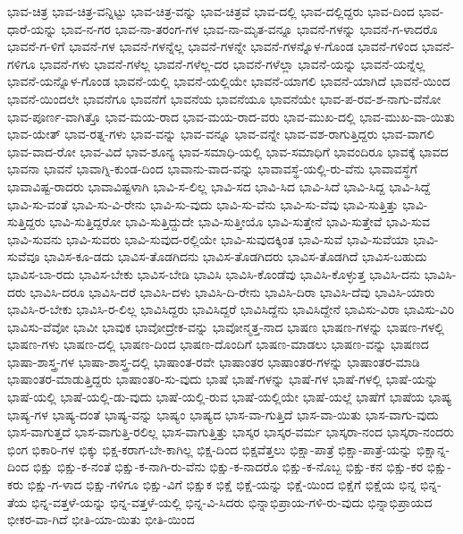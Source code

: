 {ಭಾವ-ಚಿತ್ರ
ಭಾವ-ಚಿತ್ರ-ವನ್ನಿಟ್ಟು
ಭಾವ-ಚಿತ್ರ-ವನ್ನು
ಭಾವ-ಚಿತ್ರವೆ
ಭಾವ-ದಲ್ಲಿ
ಭಾವ-ದಲ್ಲಿದ್ದರು
ಭಾವ-ದಿಂದ
ಭಾವ-ಧಾರೆ-ಯನ್ನು
ಭಾವ-ನ-ಗರ
ಭಾವ-ನಾ-ತರಂಗ-ಗಳ
ಭಾವ-ನಾ-ಮೃತ-ವನ್ನೂ
ಭಾವನೆ-ಗಳನ್ನು
ಭಾವನೆ-ಗ-ಳಾದರೊ
ಭಾವನೆ-ಗ-ಳಿಗೆ
ಭಾವನೆ-ಗಳ
ಭಾವನೆ-ಗಳನ್ನೆಲ್ಲ
ಭಾವನೆ-ಗಳನ್ನೇ
ಭಾವನೆ-ಗಳನ್ನೊಳ-ಗೊಂಡ
ಭಾವನೆ-ಗಳಿಂದ
ಭಾವನೆ-ಗಳಿಗೂ
ಭಾವನೆ-ಗಳು
ಭಾವನೆ-ಗಳೆಲ್ಲ
ಭಾವನೆ-ಗಳೆಲ್ಲ-ದರ
ಭಾವನೆ-ಗಳೆಲ್ಲಾ
ಭಾವನೆ-ಯನ್ನು
ಭಾವನೆ-ಯನ್ನೆಲ್ಲ
ಭಾವನೆ-ಯನ್ನೊಳ-ಗೊಂಡ
ಭಾವನೆ-ಯಲ್ಲಿ
ಭಾವನೆ-ಯಲ್ಲಿಯೇ
ಭಾವನೆ-ಯಾಗಲಿ
ಭಾವನೆ-ಯಾಗಿದೆ
ಭಾವನೆ-ಯಿಂದ
ಭಾವನೆ-ಯಿಂದಲೇ
ಭಾವನೆಗೂ
ಭಾವನೆಗೆ
ಭಾವನೆಯ
ಭಾವನೆಯೂ
ಭಾವನೆಯೇ
ಭಾವ-ಪ-ರವ-ಶ-ನಾಗು-ವೆನೋ
ಭಾವ-ಪೂರ್ಣ-ವಾಗಿತ್ತೊ
ಭಾವ-ಮಯ-ರಾದ
ಭಾವ-ಮಯ-ರಾದ-ವರು
ಭಾವ-ಮುಖ-ದಲ್ಲಿ
ಭಾವ-ಮುಖ-ವಾ-ಯಿತು
ಭಾವ-ಯೇತ್
ಭಾವ-ರತ್ನ-ಗಳು
ಭಾವ-ವನ್ನು
ಭಾವ-ವನ್ನೂ
ಭಾವ-ವನ್ನೇ
ಭಾವ-ವಶ-ರಾಗುತ್ತಿದ್ದರು
ಭಾವ-ವಾಗಲಿ
ಭಾವ-ವಾದ-ರೋ
ಭಾವ-ವಿದೆ
ಭಾವ-ಶೂನ್ಯ
ಭಾವ-ಸಮಾಧಿ-ಯಲ್ಲಿ
ಭಾವ-ಸಮಾಧಿಗೆ
ಭಾವಂದಿರೂ
ಭಾವಕ್ಕೆ
ಭಾವದ
ಭಾವನಾ
ಭಾವನೆ
ಭಾವಾಗ್ನಿ-ಕುಂಡ-ದಿಂದ
ಭಾವಾನು-ವಾದ-ವನ್ನು
ಭಾವಾವಸ್ಥೆ-ಯಲ್ಲಿ-ರು-ವೆನು
ಭಾವಾವಸ್ಥೆಗೆ
ಭಾವಾವಿಷ್ಟ-ರಾದರು
ಭಾವಾವಿಷ್ಟಳಾಗಿ
ಭಾವಿ-ಸ-ಲಿಲ್ಲ
ಭಾವಿ-ಸದ
ಭಾವಿ-ಸಿದ
ಭಾವಿ-ಸಿದೆ
ಭಾವಿ-ಸಿದ್ದ
ಭಾವಿ-ಸಿದ್ದೆ
ಭಾವಿ-ಸು-ವಂತೆ
ಭಾವಿ-ಸು-ವಿ-ರೇನು
ಭಾವಿ-ಸು-ವುದು
ಭಾವಿ-ಸು-ವೆನು
ಭಾವಿ-ಸು-ವೆವು
ಭಾವಿ-ಸುತ್ತಿತ್ತು
ಭಾವಿ-ಸುತ್ತಿದ್ದರು
ಭಾವಿ-ಸುತ್ತಿದ್ದರೋ
ಭಾವಿ-ಸುತ್ತಿದ್ದುದೇ
ಭಾವಿ-ಸುತ್ತೀಯೊ
ಭಾವಿ-ಸುತ್ತೇನೆ
ಭಾವಿ-ಸುತ್ತೇವೆ
ಭಾವಿ-ಸುವ
ಭಾವಿ-ಸುವನು
ಭಾವಿ-ಸುವರು
ಭಾವಿ-ಸುವುದ-ರಲ್ಲಿಯೇ
ಭಾವಿ-ಸುವುದಕ್ಕಿಂತ
ಭಾವಿ-ಸುವೆ
ಭಾವಿ-ಸುವೆಯಾ
ಭಾವಿ-ಸುವೆವೂ
ಭಾವಿಸ-ಕೂ-ಡದು
ಭಾವಿಸ-ತೊಡಗಿದನು
ಭಾವಿಸ-ತೊಡಗಿದರು
ಭಾವಿಸ-ತೊಡಗಿದೆ
ಭಾವಿಸ-ಬಹುದು
ಭಾವಿಸ-ಬಾ-ರದು
ಭಾವಿಸ-ಬೇಕು
ಭಾವಿಸ-ಬೇಡಿ
ಭಾವಿಸಿ
ಭಾವಿಸಿ-ಕೊಂಡೆವು
ಭಾವಿಸಿ-ಕೊಳ್ಳುತ್ತ
ಭಾವಿಸಿ-ದನು
ಭಾವಿಸಿ-ದರು
ಭಾವಿಸಿ-ದರೂ
ಭಾವಿಸಿ-ದರೆ
ಭಾವಿಸಿ-ದಳು
ಭಾವಿಸಿ-ದಿ-ರೇನು
ಭಾವಿಸಿ-ದಿರಾ
ಭಾವಿಸಿ-ದೆವು
ಭಾವಿಸಿ-ಯಾರು
ಭಾವಿಸಿ-ರ-ಬೇಕು
ಭಾವಿಸಿ-ರ-ಲಿಲ್ಲ
ಭಾವಿಸಿದ್ದರು
ಭಾವಿಸಿದ್ದರೆ
ಭಾವಿಸಿದ್ದೆನು
ಭಾವಿಸಿದ್ದೇನೆ
ಭಾವಿಸು-ವಿರಾ
ಭಾವಿಸು-ವಿರಿ
ಭಾವಿಸು-ವೆವೋ
ಭಾವೀ
ಭಾವುಕ
ಭಾವೋದ್ರೇಕ-ವನ್ನು
ಭಾವೋನ್ಮತ್ತ-ನಾದ
ಭಾಷಣ
ಭಾಷಣ-ಗಳನ್ನು
ಭಾಷಣ-ಗಳಲ್ಲಿ
ಭಾಷಣ-ಗಳು
ಭಾಷಣ-ದಲ್ಲಿ
ಭಾಷಣ-ದಿಂದ
ಭಾಷಣ-ದೊಂದಿಗೆ
ಭಾಷಣ-ಮಾಡಲು
ಭಾಷಣ-ವನ್ನು
ಭಾಷಣದ
ಭಾಷಾ-ಶಾಸ್ತ್ರ-ಗಳ
ಭಾಷಾ-ಶಾಸ್ತ್ರ-ದಲ್ಲಿ
ಭಾಷಾಂತ-ರವೇ
ಭಾಷಾಂತರ
ಭಾಷಾಂತರ-ಗಳನ್ನು
ಭಾಷಾಂತರ-ಮಾಡಿ
ಭಾಷಾಂತರ-ಮಾಡುತ್ತಿದ್ದರು
ಭಾಷಾಂತರಿ-ಸು-ವುದು
ಭಾಷೆ
ಭಾಷೆ-ಗಳನ್ನು
ಭಾಷೆ-ಗಳ
ಭಾಷೆ-ಗಳಲ್ಲಿ
ಭಾಷೆ-ಯನ್ನು
ಭಾಷೆ-ಯಲ್ಲಿ
ಭಾಷೆ-ಯಲ್ಲಿ-ಡು-ವುದು
ಭಾಷೆ-ಯಲ್ಲಿ-ರುವ
ಭಾಷೆ-ಯಲ್ಲಿಯೇ
ಭಾಷೆ-ಯಲ್ಲೆ
ಭಾಷೆಗೆ
ಭಾಷೆಯ
ಭಾಷ್ಯ
ಭಾಷ್ಯ-ಗಳ
ಭಾಷ್ಯ-ದಂತೆ
ಭಾಷ್ಯ-ವನ್ನು
ಭಾಷ್ಯಂ
ಭಾಷ್ಯದ
ಭಾಸ-ವಾ-ಗುತ್ತಿದೆ
ಭಾಸ-ವಾ-ಯಿತು
ಭಾಸ-ವಾಗು-ವುದು
ಭಾಸ-ವಾಗುತ್ತದೆ
ಭಾಸ-ವಾಗುತ್ತಿ-ರಲಿಲ್ಲ
ಭಾಸ-ವಾಗುತ್ತಿತ್ತು
ಭಾಸ್ಕರ
ಭಾಸ್ಕರ-ವರ್ಮ
ಭಾಸ್ಕರಾ-ನಂದ
ಭಾಸ್ಕರಾ-ನಂದರು
ಭಿಂಗ
ಭಿಕಾರಿ-ಗಳ
ಭಿಕ್ಕು
ಭಿಕ್ಷ-ಕರಾಗ-ಬೇ-ಕಾಗಿಲ್ಲ
ಭಿಕ್ಷ-ದಿಂದ
ಭಿಕ್ಷವೆತ್ತಲು
ಭಿಕ್ಷಾ-ಪಾತ್ರೆ
ಭಿಕ್ಷಾ-ಪಾತ್ರೆ-ಯನ್ನು
ಭಿಕ್ಷಾನ್ನ-ದಿಂದ
ಭಿಕ್ಷು
ಭಿಕ್ಷು-ಕ-ನಂತೆ
ಭಿಕ್ಷು-ಕ-ನಾಗಿ-ರು-ವೆನು
ಭಿಕ್ಷು-ಕ-ನಾದರೊ
ಭಿಕ್ಷು-ಕ-ನೊಬ್ಬ
ಭಿಕ್ಷು-ಕನ
ಭಿಕ್ಷು-ಕರ
ಭಿಕ್ಷು-ಕರು
ಭಿಕ್ಷು-ಗ-ಳಾದ
ಭಿಕ್ಷು-ಗಳಿಗೂ
ಭಿಕ್ಷು-ವಿಗೆ
ಭಿಕ್ಷುಕ
ಭಿಕ್ಷೆ
ಭಿಕ್ಷೆ-ಯನ್ನು
ಭಿಕ್ಷೆ-ಯಿಂದ
ಭಿಕ್ಷೆಗೆ
ಭಿಕ್ಷೆಯ
ಭಿನ್ನ
ಭಿನ್ನ-ತೆಯ
ಭಿನ್ನ-ವತ್ತಳೆ-ಯನ್ನು
ಭಿನ್ನ-ವತ್ತಳೆ-ಯಲ್ಲಿ
ಭಿನ್ನ-ವಿ-ಸಿದರು
ಭಿನ್ನಾಭಿಪ್ರಾಯ-ಗಳಿ-ರು-ವುದು
ಭಿನ್ನಾಭಿಪ್ರಾಯದ
ಭೀಕರ-ವಾ-ಗಿದೆ
ಭೀತಿ-ಯಾ-ಯಿತು
ಭೀತಿ-ಯಿಂದ
}
